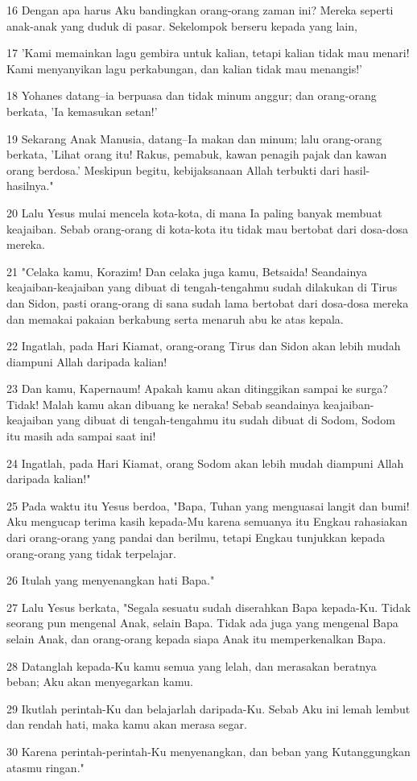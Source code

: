 \par 16 Dengan apa harus Aku bandingkan orang-orang zaman ini? Mereka seperti anak-anak yang duduk di pasar. Sekelompok berseru kepada yang lain,
\par 17 'Kami memainkan lagu gembira untuk kalian, tetapi kalian tidak mau menari! Kami menyanyikan lagu perkabungan, dan kalian tidak mau menangis!'
\par 18 Yohanes datang--ia berpuasa dan tidak minum anggur; dan orang-orang berkata, 'Ia kemasukan setan!'
\par 19 Sekarang Anak Manusia, datang--Ia makan dan minum; lalu orang-orang berkata, 'Lihat orang itu! Rakus, pemabuk, kawan penagih pajak dan kawan orang berdosa.' Meskipun begitu, kebijaksanaan Allah terbukti dari hasil-hasilnya."
\par 20 Lalu Yesus mulai mencela kota-kota, di mana Ia paling banyak membuat keajaiban. Sebab orang-orang di kota-kota itu tidak mau bertobat dari dosa-dosa mereka.
\par 21 "Celaka kamu, Korazim! Dan celaka juga kamu, Betsaida! Seandainya keajaiban-keajaiban yang dibuat di tengah-tengahmu sudah dilakukan di Tirus dan Sidon, pasti orang-orang di sana sudah lama bertobat dari dosa-dosa mereka dan memakai pakaian berkabung serta menaruh abu ke atas kepala.
\par 22 Ingatlah, pada Hari Kiamat, orang-orang Tirus dan Sidon akan lebih mudah diampuni Allah daripada kalian!
\par 23 Dan kamu, Kapernaum! Apakah kamu akan ditinggikan sampai ke surga? Tidak! Malah kamu akan dibuang ke neraka! Sebab seandainya keajaiban-keajaiban yang dibuat di tengah-tengahmu itu sudah dibuat di Sodom, Sodom itu masih ada sampai saat ini!
\par 24 Ingatlah, pada Hari Kiamat, orang Sodom akan lebih mudah diampuni Allah daripada kalian!"
\par 25 Pada waktu itu Yesus berdoa, "Bapa, Tuhan yang menguasai langit dan bumi! Aku mengucap terima kasih kepada-Mu karena semuanya itu Engkau rahasiakan dari orang-orang yang pandai dan berilmu, tetapi Engkau tunjukkan kepada orang-orang yang tidak terpelajar.
\par 26 Itulah yang menyenangkan hati Bapa."
\par 27 Lalu Yesus berkata, "Segala sesuatu sudah diserahkan Bapa kepada-Ku. Tidak seorang pun mengenal Anak, selain Bapa. Tidak ada juga yang mengenal Bapa selain Anak, dan orang-orang kepada siapa Anak itu memperkenalkan Bapa.
\par 28 Datanglah kepada-Ku kamu semua yang lelah, dan merasakan beratnya beban; Aku akan menyegarkan kamu.
\par 29 Ikutlah perintah-Ku dan belajarlah daripada-Ku. Sebab Aku ini lemah lembut dan rendah hati, maka kamu akan merasa segar.
\par 30 Karena perintah-perintah-Ku menyenangkan, dan beban yang Kutanggungkan atasmu ringan."

